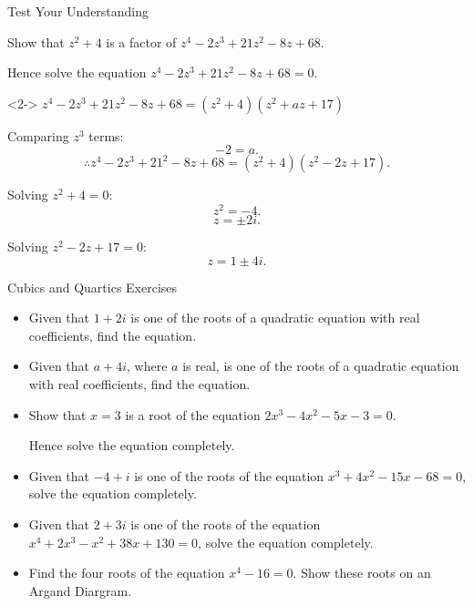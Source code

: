 \documentclass[8pt]{beamer}
\begin{document}
\begin{frame}{Test Your Understanding}
	\begin{problem}
		Show that $z^2+4$ is a factor of $z^4-2z^3+21z^2-8z+68$.

		Hence solve the equation $z^4-2z^3+21z^2-8z+68=0$.
	\end{problem}

	\begin{solution}<2->
		$z^4-2z^3+21z^2-8z+68=(z^2+4)(z^2+az+17)$

		Comparing $z^3$ terms:
		\[
		-2=a
		.\] 
		\[
			\therefore z^4-2z^3+21^2-8z+68=(z^2+4)(z^2-2z+17)
		.\] 

		Solving $z^2+4=0$:
		\[
		z^2=-4
		.\] 
		\[
		z=\pm 2i
		.\] 

		Solving $z^2-2z+17=0:$
		\[
		z=1\pm 4i
		.\] 
	\end{solution}
\end{frame}



\begin{frame}{Cubics and Quartics Exercises}
	\begin{itemize}
		\item Given that $1+2i$ is one of the roots of a quadratic equation with real coefficients, find the equation.


		\item Given that $a+4i$, where  $a$ is real, is one of the roots of a quadratic equation with real
coefficients, find the equation.


\item Show that $x=3$ is a root of the equation  $2x^3-4x^2-5x-3=0$.

	Hence solve the equation completely.


\item Given that $-4+i$ is one of the roots of the equation  $x^3+4x^2-15x-68=0$, solve the equation completely.


\item Given that  $2+3i$ is one of the roots of the equation $x^4+2x^3-x^2+38x+130=0$, solve the equation completely.


\item Find the four roots of the equation $x^4-16=0.$ Show these roots on an Argand Diargram.

	\end{itemize}
\end{frame}
\end{document}
